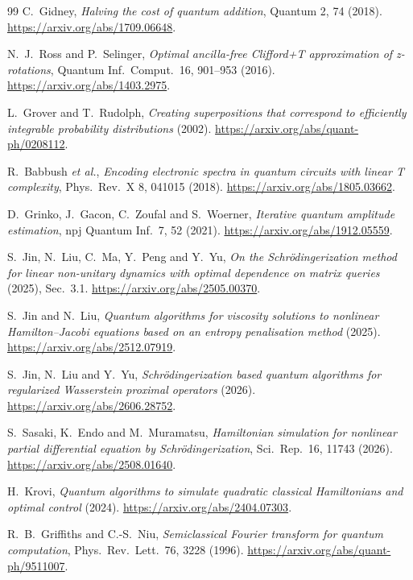 \documentclass[11pt,a4paper]{article}
\begin{document}
\begin{thebibliography}{99}
 C.~Gidney, \emph{Halving the cost of quantum
addition}, Quantum 2, 74 (2018). \url{https://arxiv.org/abs/1709.06648}.

 N.~J.~Ross and P.~Selinger, \emph{Optimal
ancilla-free Clifford+T approximation of z-rotations}, Quantum
Inf.~Comput.~16, 901--953 (2016). \url{https://arxiv.org/abs/1403.2975}.

 L.~Grover and T.~Rudolph, \emph{Creating
superpositions that correspond to efficiently integrable probability
distributions} (2002). \url{https://arxiv.org/abs/quant-ph/0208112}.

 R.~Babbush \emph{et al.}, \emph{Encoding electronic
spectra in quantum circuits with linear T complexity}, Phys.~Rev.~X 8,
041015 (2018). \url{https://arxiv.org/abs/1805.03662}.

 D.~Grinko, J.~Gacon, C.~Zoufal and S.~Woerner,
\emph{Iterative quantum amplitude estimation}, npj Quantum Inf.~7, 52
(2021). \url{https://arxiv.org/abs/1912.05559}.

 S.~Jin, N.~Liu, C.~Ma, Y.~Peng and Y.~Yu, \emph{On the
Schr\"odingerization method for linear non-unitary dynamics with optimal
dependence on matrix queries} (2025), Sec.~3.1.
\url{https://arxiv.org/abs/2505.00370}.

 S.~Jin and N.~Liu, \emph{Quantum algorithms for viscosity
solutions to nonlinear Hamilton--Jacobi equations based on an entropy
penalisation method} (2025). \url{https://arxiv.org/abs/2512.07919}.

 S.~Jin, N.~Liu and Y.~Yu, \emph{Schr\"odingerization based
quantum algorithms for regularized Wasserstein proximal operators} (2026).
\url{https://arxiv.org/abs/2606.28752}.

 S.~Sasaki, K.~Endo and M.~Muramatsu, \emph{Hamiltonian
simulation for nonlinear partial differential equation by
Schr\"odingerization}, Sci.~Rep.~16, 11743 (2026).
\url{https://arxiv.org/abs/2508.01640}.

 H.~Krovi, \emph{Quantum algorithms to simulate quadratic
classical Hamiltonians and optimal control} (2024).
\url{https://arxiv.org/abs/2404.07303}.

 R.~B.~Griffiths and C.-S.~Niu, \emph{Semiclassical Fourier
transform for quantum computation}, Phys.~Rev.~Lett.~76, 3228 (1996).
\url{https://arxiv.org/abs/quant-ph/9511007}.
\end{thebibliography}
\end{document}
